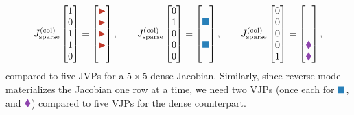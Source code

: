 \begin{equation}
    J^{(\text{col})}_{\text{sparse}} 
    \begin{bmatrix}
    1 \\ 0 \\ 1 \\ 1 \\ 0    
    \end{bmatrix}
    = 
    \begin{bmatrix}
    \color{myred}{\blacktriangleright} \\ \color{myred}{\blacktriangleright} \\ \color{myred}{\blacktriangleright} \\ \color{myred}{\blacktriangleright} \\ \\   
    \end{bmatrix}, \qquad
    J^{(\text{col})}_{\text{sparse}} 
    \begin{bmatrix}
    0 \\ 1 \\ 0 \\ 0 \\ 0    
    \end{bmatrix}
    = 
    \begin{bmatrix}
    \\ \color{myblue}{\blacksquare} \\ \\ \color{myblue}{\blacksquare} \\ \\ 
    \end{bmatrix}, \qquad
    J^{(\text{col})}_{\text{sparse}} 
    \begin{bmatrix}
    0 \\ 0 \\ 0 \\ 0 \\ 1    
    \end{bmatrix}
    = 
    \begin{bmatrix}
    \\ \\ \\ \color{myviolet}{\blacklozenge} \\ \color{myviolet}{\blacklozenge} \\ 
    \end{bmatrix},
\end{equation}
compared to five JVPs for a $5 \times 5$ dense Jacobian.
Similarly, since reverse mode materializes the Jacobian one row at a time, we need two VJPs (once each for $\color{myblue}{\blacksquare}$, and $\color{myviolet}{\blacklozenge}$) compared to five VJPs for the dense counterpart. 